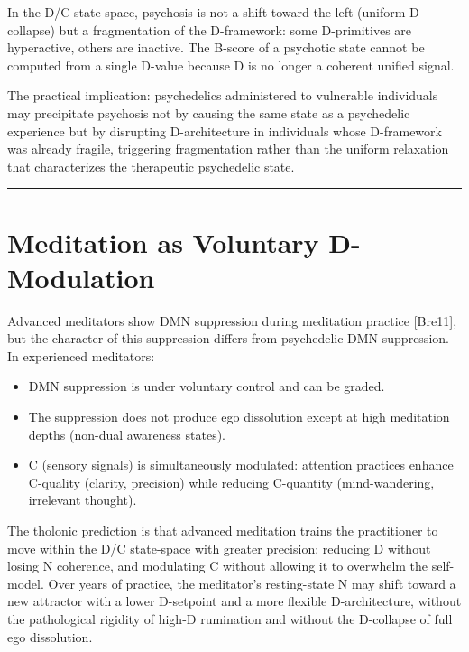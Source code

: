 \documentclass[12pt]{article}
\providecommand{\tightlist}{%
  \setlength{\itemsep}{0pt}\setlength{\parskip}{0pt}}
\begin{document}
In the D/C state-space, psychosis is not a shift toward the left
(uniform D-collapse) but a fragmentation of the D-framework: some
D-primitives are hyperactive, others are inactive. The B-score of a
psychotic state cannot be computed from a single D-value because D is no
longer a coherent unified signal.

The practical implication: psychedelics administered to vulnerable
individuals may precipitate psychosis not by causing the same state as a
psychedelic experience but by disrupting D-architecture in individuals
whose D-framework was already fragile, triggering fragmentation rather
than the uniform relaxation that characterizes the therapeutic
psychedelic state.

\begin{center}\rule{0.5\linewidth}{0.5pt}\end{center}

\section{Meditation as Voluntary D-Modulation}\label{meditation-as-voluntary-d-modulation}

Advanced meditators show DMN suppression during meditation practice
{[}Bre11{]}, but the character of this suppression differs from
psychedelic DMN suppression. In experienced meditators:

\begin{itemize}
\tightlist
\item
  DMN suppression is under voluntary control and can be graded.
\item
  The suppression does not produce ego dissolution except at high
  meditation depths (non-dual awareness states).
\item
  C (sensory signals) is simultaneously modulated: attention practices
  enhance C-quality (clarity, precision) while reducing C-quantity
  (mind-wandering, irrelevant thought).
\end{itemize}

The tholonic prediction is that advanced meditation trains the
practitioner to move within the D/C state-space with greater precision:
reducing D without losing N coherence, and modulating C without allowing
it to overwhelm the self-model. Over years of practice, the meditator's
resting-state N may shift toward a new attractor with a lower D-setpoint
and a more flexible D-architecture, without the pathological rigidity of
high-D rumination and without the D-collapse of full ego dissolution.
\end{document}

